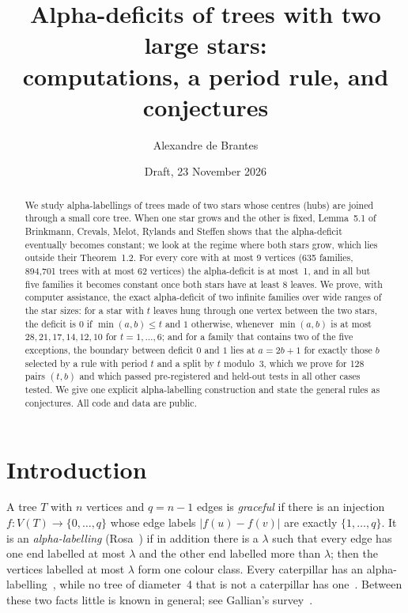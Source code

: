 \documentclass[11pt]{amsart}
\title[Alpha-deficits of two-hub trees]{Alpha-deficits of trees with two large stars:\\ computations, a period rule, and conjectures}
\author{Alexandre de Brantes}
\date{Draft, 23 November 2026}
\theoremstyle{definition}
\begin{document}
\begin{abstract}
We study alpha-labellings of trees made of two stars whose centres (hubs) are joined through a small core
tree. When one star grows and the other is fixed, Lemma~5.1 of Brinkmann, Crevals, Melot, Rylands and Steffen
shows that the alpha-deficit eventually becomes constant; we look at the regime where both stars grow, which
lies outside their Theorem~1.2. For every core with at most 9 vertices (635 families, 894{,}701 trees with at
most 62 vertices) the alpha-deficit is at most~1, and in all but five families it becomes constant once both
stars have at least 8 leaves. We prove, with computer assistance, the exact alpha-deficit of two
infinite families over wide ranges of the star sizes: for a star with $t$ leaves hung through one vertex
between the two stars, the deficit is $0$ if $\min(a,b)\le t$ and $1$ otherwise, whenever $\min(a,b)$ is at most
$28,21,17,14,12,10$ for $t=1,\dots,6$; and for a family that contains two of the five exceptions, the boundary between
deficit $0$ and $1$ lies at $a=2b+1$ for exactly those $b$ selected by a rule with period $t$ and a split by $t$
modulo~$3$, which we prove for 128 pairs $(t,b)$ and which passed pre-registered and held-out tests in all
other cases tested. We give one explicit alpha-labelling construction and state the general rules as
conjectures. All code and data are public.
\end{abstract}

\maketitle

\section{Introduction}

A tree $T$ with $n$ vertices and $q=n-1$ edges is \emph{graceful} if there is an injection
$f\colon V(T)\to\{0,\dots,q\}$ whose edge labels $|f(u)-f(v)|$ are exactly $\{1,\dots,q\}$. It is an
\emph{alpha-labelling} (Rosa~\cite{rosa}) if in addition there is a $\lambda$ such that every edge has one end
labelled at most $\lambda$ and the other end labelled more than $\lambda$; then the vertices labelled at most
$\lambda$ form one colour class. Every caterpillar has an alpha-labelling~\cite{rosa}, while no tree of diameter~4
that is not a caterpillar has one~\cite{hkr}.
 Between these two facts little is known in general; see Gallian's
survey~\cite{gallian}.
\end{document}
